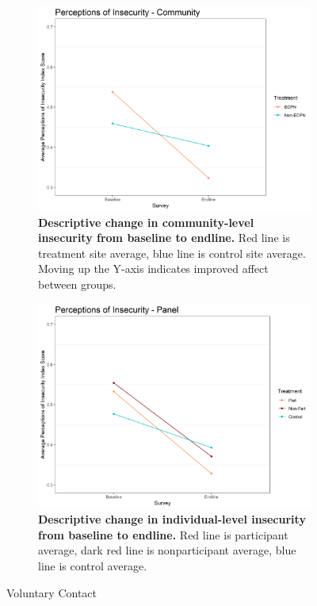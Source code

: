 \documentclass[11pt]{article}
\begin{document}
\begin{figure}[H]
    \begin{subfigure}[b]{.48\textwidth}
    \centering
        \includegraphics[width=\linewidth]{../../../figs/inComm_plot.png}
        \caption{\textbf{Descriptive change in community-level insecurity from baseline to endline.} Red line is treatment site average, blue line is control site average.  Moving up the Y-axis indicates improved affect between groups.}
        \label{fig:fig7}
    \end{subfigure}
    \hfill
    \begin{subfigure}[b]{.48\textwidth}
    \centering
        \includegraphics[width=\linewidth]{../../../figs/inPan_plot.png}
        \caption{\textbf{Descriptive change in individual-level insecurity from baseline to endline.} Red line is participant average, dark red line is nonparticipant average, blue line is control average.}
        \label{fig:fig8}
    \end{subfigure}
    \caption{Voluntary Contact}
\end{figure}
\end{document}
